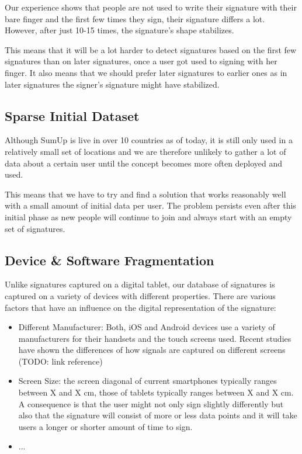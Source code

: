 \documentclass[a4paper, oneside]{csthesis}
\begin{document}
Our experience shows that people are not used to write their signature with their bare finger and the first few times they sign, their signature differs a lot. However, after just 10-15 times, the signature's shape stabilizes.

This means that it will be a lot harder to detect signatures based on the first few signatures than on later signatures, once a user got used to signing with her finger.
It also means that we should prefer later signatures to earlier ones as in later signatures the signer's signature might have stabilized.


\subsection{Sparse Initial Dataset}

Although SumUp is live in over 10 countries as of today, it is still only used in a relatively small set of locations and we are therefore unlikely to gather a lot of data about a certain user until the concept becomes more often deployed and used.

This means that we have to try and find a solution that works reasonably well with a small amount of initial data per user. The problem persists even after this initial phase as new people will continue to join and always start with an empty set of signatures.


\subsection{Device \& Software Fragmentation}

Unlike signatures captured on a digital tablet, our database of signatures is captured on a variety of devices with different properties. There are various factors that have an influence on the digital representation of the signature:

\begin{itemize}
\item Different Manufacturer: Both, iOS and Android devices use a variety of manufacturers for their handsets and the touch screens used. Recent studies have shown the differences of how signals are captured on different screens (TODO: link reference)
\item Screen Size: the screen diagonal of current smartphones typically ranges between X and X cm, those of tablets typically ranges between X and X cm. A consequence is that the user might not only sign slightly differently but also that the signature will consist of more or less data points and it will take users a longer or shorter amount of time to sign.
\item  ...
\end{itemize}
\end{document}
